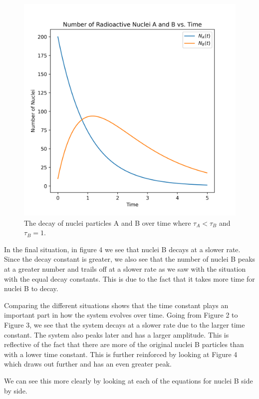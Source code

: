 \documentclass[pra,twocolumn,showpacs,amsmath,amssymb]{revtex4-2}
\begin{document}
\begin{figure}[H]
\includegraphics[scale=0.50]{Nuclei_AB_1.5_0.01.png}
\caption{The decay of nuclei particles A and B over time where \(\tau_A < \tau_B\) and \(\tau_B = 1\).}\label{Proj1Equal}
\end{figure}

In the final situation, in figure 4 we see that nuclei B decays at a slower rate. Since the decay constant is greater, we also see that the number of nuclei B peaks at a greater number and trails off at a slower rate as we saw with the situation with the equal decay constants. This is due to the fact that it takes more time for nuclei B to decay.

\par Comparing the different situations shows that the time constant plays an important part in how the system evolves over time. Going from Figure 2 to Figure 3, we see that the system decays at a slower rate due to the larger time constant. The system also peaks later and has a larger amplitude. This is reflective of the fact that there are more of the original nuclei B particles than with a lower time constant. This is further reinforced by looking at Figure 4 which draws out further and has an even greater peak.

\par We can see this more clearly by looking at each of the equations for nuclei B side by side.
\end{document}
